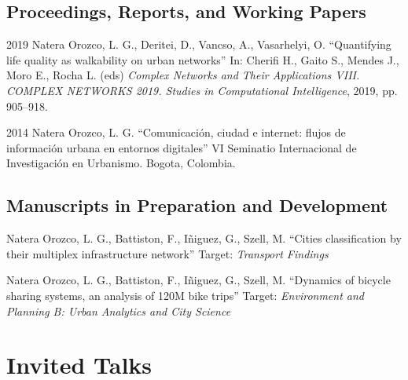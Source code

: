 \documentclass{academiccv}
\begin{document}
\subsection*{Proceedings, Reports, and Working Papers}

\begin{tablist}

\item[2019] \tab Natera Orozco, L. G., Deritei, D., Vancso, A., Vasarhelyi, O. \enquote{Quantifying life quality as walkability on urban networks} In: Cherifi H., Gaito S., Mendes J., Moro E., Rocha L. (eds) \textit{Complex Networks and Their Applications VIII. COMPLEX NETWORKS 2019. Studies in Computational Intelligence}, 2019, pp. 905–918.

\item[2014] \tab Natera Orozco, L. G. \enquote{Comunicación, ciudad e internet: flujos de información urbana en entornos digitales} VI Seminatio Internacional de Investigación en Urbanismo. Bogota, Colombia.

\end{tablist}



\subsection*{Manuscripts in Preparation and Development}

\begin{tablist}

\item[\the\year] Natera Orozco, L. G., Battiston, F., I\~niguez, G., Szell, M. \enquote{Cities classification by their multiplex infrastructure network} Target: \textit{Transport Findings}

\item[\the\year] Natera Orozco, L. G., Battiston, F., I\~niguez, G., Szell, M. \enquote{Dynamics of bicycle sharing systems, an analysis of 120M bike trips} Target: \textit{Environment and Planning B: Urban Analytics and City Science}

\end{tablist}


\section*{Invited Talks}
\end{document}
